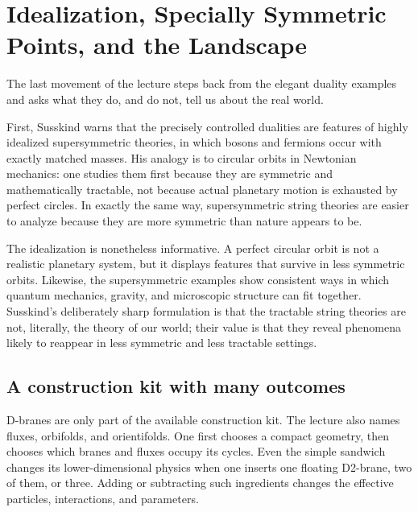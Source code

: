 \begin{classroomqa}
\end{classroomqa}

\section{Idealization, Specially Symmetric Points, and the Landscape}

The last movement of the lecture steps back from the elegant duality examples and asks what they do, and do not, tell us about the real world.

First, Susskind warns that the precisely controlled dualities are features of highly idealized supersymmetric theories, in which bosons and fermions occur with exactly matched masses. His analogy is to circular orbits in Newtonian mechanics: one studies them first because they are symmetric and mathematically tractable, not because actual planetary motion is exhausted by perfect circles. In exactly the same way, supersymmetric string theories are easier to analyze because they are more symmetric than nature appears to be.

The idealization is nonetheless informative. A perfect circular orbit is not a realistic planetary system, but it displays features that survive in less symmetric orbits. Likewise, the supersymmetric examples show consistent ways in which quantum mechanics, gravity, and microscopic structure can fit together. Susskind's deliberately sharp formulation is that the tractable string theories are not, literally, the theory of our world; their value is that they reveal phenomena likely to reappear in less symmetric and less tractable settings.

\subsection{A construction kit with many outcomes}

D-branes are only part of the available construction kit. The lecture also names fluxes, orbifolds, and orientifolds. One first chooses a compact geometry, then chooses which branes and fluxes occupy its cycles. Even the simple sandwich changes its lower-dimensional physics when one inserts one floating D2-brane, two of them, or three. Adding or subtracting such ingredients changes the effective particles, interactions, and parameters.

